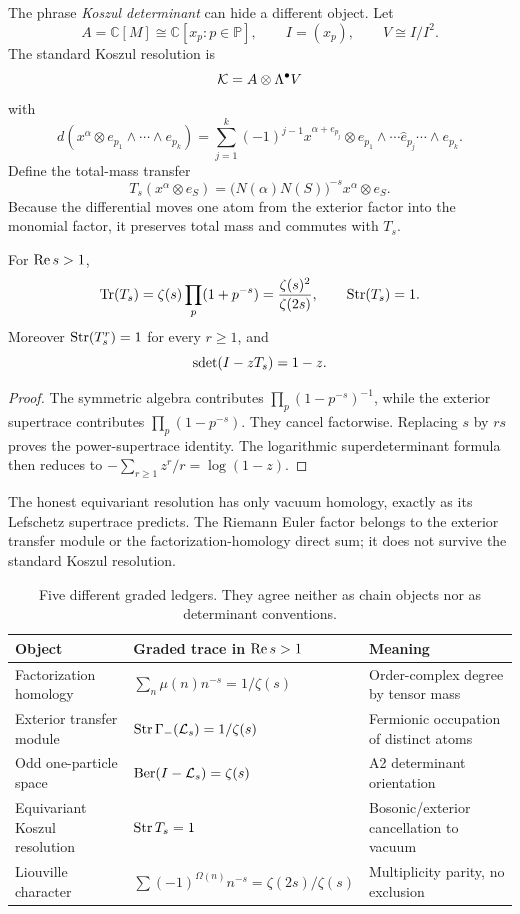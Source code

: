 The phrase \emph{Koszul determinant} can hide a different object. Let
\[
 A=\mathbb C[M]\cong\mathbb C[x_p:p\in\mathbb P],
 \qquad I=(x_p),
 \qquad V\cong I/I^2.
\]
The standard Koszul resolution is
\[
 \mathcal K=A\otimes\Lambda^\bullet V
\]
with
\[
d(x^\alpha\otimes e_{p_1}\wedge\cdots\wedge e_{p_k})
=\sum_{j=1}^k(-1)^{j-1}
x^{\alpha+e_{p_j}}\otimes
e_{p_1}\wedge\cdots\widehat e_{p_j}\cdots\wedge e_{p_k}.
\]
Define the total-mass transfer
\[
 T_s(x^\alpha\otimes e_S)
 =\bigl(N(\alpha)N(S)\bigr)^{-s}
   x^\alpha\otimes e_S.
\]
Because the differential moves one atom from the exterior factor into the
monomial factor, it preserves total mass and commutes with $T_s$.

\begin{theorem}
\label{thm:koszul-cancel}
For $\operatorname{Re} s>1$,
\[
 \operatorname{Tr}(T_s)
 =\zeta(s)\prod_p(1+p^{-s})
 =\frac{\zeta(s)^2}{\zeta(2s)},
 \qquad
 \operatorname{Str}(T_s)=1.
\]
Moreover $\operatorname{Str}(T_s^r)=1$ for every $r\ge1$, and
\[
 \operatorname{sdet}(I-zT_s)=1-z.
\]
\end{theorem}

\begin{proof}
The symmetric algebra contributes
$\prod_p(1-p^{-s})^{-1}$, while the exterior supertrace contributes
$\prod_p(1-p^{-s})$. They cancel factorwise. Replacing $s$ by $rs$ proves
the power-supertrace identity. The logarithmic superdeterminant formula then
reduces to $-\sum_{r\ge1}z^r/r=\log(1-z)$.
\end{proof}

The honest equivariant resolution has only vacuum homology, exactly as its
Lefschetz supertrace predicts. The Riemann Euler factor belongs to the
exterior transfer module or the factorization-homology direct sum; it does
not survive the standard Koszul resolution.

\begin{table}[t]
\centering
\small
\begin{tabularx}{0.97\textwidth}{L{0.23\textwidth}L{0.26\textwidth}X}
\toprule
Object & Graded trace in $\operatorname{Re} s>1$ & Meaning \\
\midrule
Factorization homology
  & $\sum_n\mu(n)n^{-s}=1/\zeta(s)$
  & Order-complex degree by tensor mass \\
Exterior transfer module
  & $\operatorname{Str}\Gamma_-(\mathcal L_s)=1/\zeta(s)$
  & Fermionic occupation of distinct atoms \\
Odd one-particle space
  & $\operatorname{Ber}(I-\mathcal L_s)=\zeta(s)$
  & A2 determinant orientation \\
Equivariant Koszul resolution
  & $\operatorname{Str} T_s=1$
  & Bosonic/exterior cancellation to vacuum \\
Liouville character
  & $\sum(-1)^{\Omega(n)}n^{-s}=\zeta(2s)/\zeta(s)$
  & Multiplicity parity, no exclusion \\
\bottomrule
\end{tabularx}
\caption{Five different graded ledgers. They agree neither as chain objects
nor as determinant conventions.}
\label{tab:graded-objects}
\end{table}
